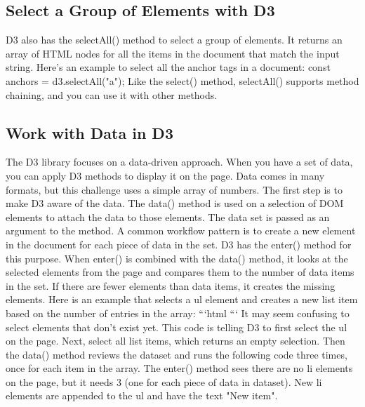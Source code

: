 \documentclass{article}%
\begin{document}
%
\subsection{Select a Group of Elements with D3}%
\label{subsec:SelectaGroupofElementswithD3}%
D3 also has the selectAll() method to select a group of elements. It returns an array of HTML nodes for all the items in the document that match the input string. Here's an example to select all the anchor tags in a document:\newline%
const anchors = d3.selectAll("a");\newline%
Like the select() method, selectAll() supports method chaining, and you can use it with other methods.\newline%

%
\subsection{Work with Data in D3}%
\label{subsec:WorkwithDatainD3}%
The D3 library focuses on a data{-}driven approach. When you have a set of data, you can apply D3 methods to display it on the page. Data comes in many formats, but this challenge uses a simple array of numbers.\newline%
The first step is to make D3 aware of the data. The data() method is used on a selection of DOM elements to attach the data to those elements. The data set is passed as an argument to the method.\newline%
A common workflow pattern is to create a new element in the document for each piece of data in the set. D3 has the enter() method for this purpose.\newline%
When enter() is combined with the data() method, it looks at the selected elements from the page and compares them to the number of data items in the set. If there are fewer elements than data items, it creates the missing elements.\newline%
Here is an example that selects a ul element and creates a new list item based on the number of entries in the array:\newline%
```html\newline%
\newline%
```\newline%
It may seem confusing to select elements that don't exist yet. This code is telling D3 to first select the ul on the page. Next, select all list items, which returns an empty selection. Then the data() method reviews the dataset and runs the following code three times, once for each item in the array. The enter() method sees there are no li elements on the page, but it needs 3 (one for each piece of data in dataset). New li elements are appended to the ul and have the text "New item".\newline%
\end{document}
